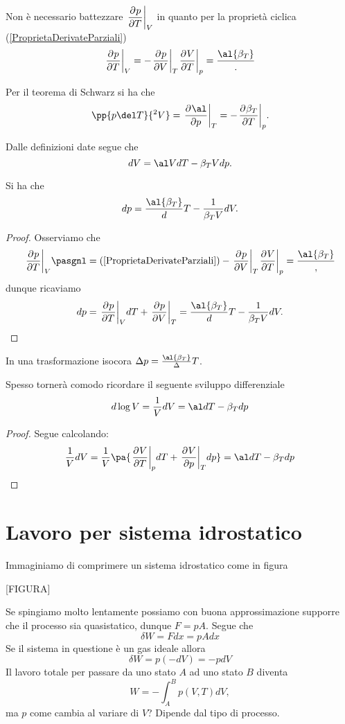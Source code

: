 \begin{remark}
Non \`e necessario battezzare $\displaystyle\ppb TpV$ in quanto per la propriet\`a ciclica (\ref{ProprietaDerivateParziali})
\[\ppb TpV=-\ppb VpT\ppb TVp=\frac\al{\beta_T}.\]
\end{remark}

\begin{remark}
Per il teorema di Schwarz si ha che
\[\pp{p\del T}{^2V}=\ppb p\al T=-\ppb T{\beta_T}p.\]
\end{remark}

\begin{remark}
Dalle definizioni date segue che
\[dV=\al VdT-\beta_T Vdp.\]
\end{remark}

\begin{proposition}\label{DifferenzialePressione}
Si ha che
\[dp=\frac\al{\beta_T}dT-\frac1{\beta_T V}dV.\]
\end{proposition}
\begin{proof}
Osserviamo che
\[\ppb TpV\pasgnl={(\ref{ProprietaDerivateParziali})}-\ppb VpT \ppb TVp=\frac \al{\beta_T},\]
dunque ricaviamo
\[dp=\ppb TpVdT+\ppb VpT=\frac\al{\beta_T}dT-\frac1{\beta_T V}dV.\]
\end{proof}
\begin{corollary}
In una trasformazione isocora $\Delta p=\frac\al{\beta_T}\Delta T$.
\end{corollary}

\begin{remark}\label{DifferenzialeLogaritmicoNelVolume}
Spesso torner\`a comodo ricordare il seguente sviluppo differenziale
\[d\log V=\frac1VdV=\al dT-\beta_T dp\]
\end{remark}
\begin{proof}
Segue calcolando:
\[\frac1VdV=\frac1V\pa{\ppb TVp dT+\ppb pVTdp}=\al dT-\beta_T dp\]
\end{proof}

\section{Lavoro per sistema idrostatico}
Immaginiamo di comprimere un sistema idrostatico come in figura 

[FIGURA]

\noindent
Se spingiamo molto lentamente possiamo con buona approssimazione supporre che il processo sia quasistatico, dunque $F=pA$. Segue che
\[\boxed{\delta W=Fdx=pAdx}\]
Se il sistema in questione \`e un gas ideale allora
\[\delta W=p(-dV)=-pdV\]
Il lavoro totale per passare da uno stato $A$ ad uno stato $B$ diventa
\[W=-\int_{A}^{B} p(V,T)dV,\]
ma $p$ come cambia al variare di $V$? Dipende dal tipo di processo.

